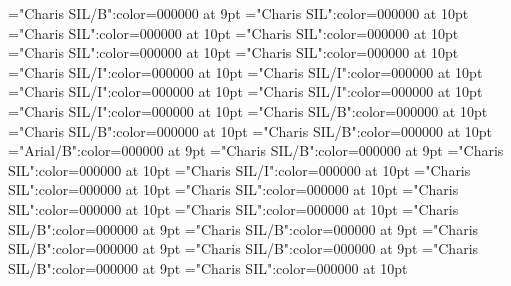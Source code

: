 \documentclass{article}
\begin{document}
\font\exampleexamplessensesensesentryletDatadicBody="Charis SIL/B":color=000000 at 9pt
\font\examplesaftersensesensesentryletDatadicBody="Charis SIL":color=000000 at 10pt
\font\examplessensesensesentryletDatadicBody="Charis SIL":color=000000 at 10pt
\font\spandefinitionsensesensesentryletDatadicBody="Charis SIL":color=000000 at 10pt
\font{}="Charis SIL":color=000000 at 10pt
\font{}="Charis SIL":color=000000 at 10pt
\font\spanpartofspeechgrammaticalinfosensesensesentryletDatadicBody="Charis SIL/I":color=000000 at 10pt
\font\partofspeechaftergrammaticalinfosensesensesentryletDatadicBody="Charis SIL/I":color=000000 at 10pt
\font\partofspeechgrammaticalinfosensesensesentryletDatadicBody="Charis SIL/I":color=000000 at 10pt
\font\grammaticalinfoaftersensesensesentryletDatadicBody="Charis SIL/I":color=000000 at 10pt
\font\grammaticalinfosensesensesentryletDatadicBody="Charis SIL/I":color=000000 at 10pt
\font\LexSensepublishRootFiniteFormaftersensesensesentryletDatadicBody="Charis SIL/B":color=000000 at 10pt
\font\LexSensepublishRootFiniteFormbeforesensesensesentryletDatadicBody="Charis SIL/B":color=000000 at 10pt
\font\LexSensepublishRootFiniteFormsensesensesentryletDatadicBody="Charis SIL/B":color=000000 at 10pt
\font\xsensenumbersensebeforesensesensesentryletDatadicBody="Arial/B":color=000000 at 9pt
\font\xsensenumbersensesensesentryletDatadicBody="Charis SIL/B":color=000000 at 9pt
\font\sensesensesentryletDatadicBody="Charis SIL":color=000000 at 10pt
\font\EmphasizedTexttranslationtranslationsexamplessensebsensesentryletDatadicBody="Charis SIL/I":color=000000 at 10pt
\font\spantranslationtranslationsexamplessensebsensesentryletDatadicBody="Charis SIL":color=000000 at 10pt
\font\translationaftertranslationsexamplessensebsensesentryletDatadicBody="Charis SIL":color=000000 at 10pt
\font\translationtranslationsexamplessensebsensesentryletDatadicBody="Charis SIL":color=000000 at 10pt
\font\translationsexamplessensebsensesentryletDatadicBody="Charis SIL":color=000000 at 10pt
\font\FocusedMcbexampleexamplessensebsensesentryletDatadicBody="Charis SIL/B":color=000000 at 9pt
\font\mcbexampleexamplessensebsensesentryletDatadicBody="Charis SIL/B":color=000000 at 9pt
\font\exampleafterexamplessensebsensesentryletDatadicBody="Charis SIL/B":color=000000 at 9pt
\font\examplebeforeexamplessensebsensesentryletDatadicBody="Charis SIL/B":color=000000 at 9pt
\font\exampleexamplessensebsensesentryletDatadicBody="Charis SIL/B":color=000000 at 9pt
\font\examplesaftersensebsensesentryletDatadicBody="Charis SIL":color=000000 at 10pt
\end{document}
